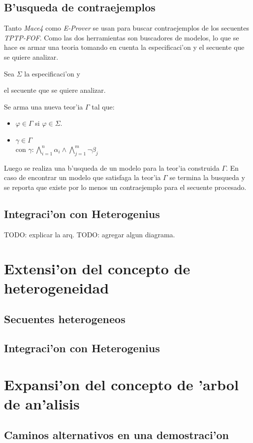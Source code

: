 \subsection{B'usqueda de contraejemplos}

Tanto \textit{Mace4} como \textit{E-Prover} se usan para buscar contraejemplos de los secuentes \textit{TPTP-FOF}. Como las dos herramientas son buscadores de modelos, lo que se hace es armar una teoria tomando en cuenta la especificaci'on y el secuente que se quiere analizar.

Sea $\Sigma$ la especificaci'on y

\begin{prooftree}
\end{prooftree}

el secuente que se quiere analizar.

Se arma una nueva teor'ia $\Gamma$ tal que:

\begin{itemize}

\item $\varphi \in \Gamma$ si $\varphi \in \Sigma$.

\item $\gamma \in \Gamma$ \\
	con $\gamma: \bigwedge\limits_{i=1}^n{\alpha_i} \wedge \bigwedge\limits_{j=1}^m{\neg \beta_{j}}$

\end{itemize}

Luego se realiza una b'usqueda de un modelo para la teor'ia construida $\Gamma$. En caso de encontrar un modelo que satisfaga la teor'ia $\Gamma$ se termina la busqueda y se reporta que existe por lo menos un contraejemplo para el secuente procesado.


\subsection{Integraci'on con Heterogenius}

TODO: explicar la arq.
TODO: agregar algun diagrama.


\section{Extensi'on del concepto de heterogeneidad}

\subsection{Secuentes heterogeneos}

\subsection{Integraci'on con Heterogenius}


\section{Expansi'on del concepto de 'arbol de an'alisis}

\subsection{Caminos alternativos en una demostraci'on}

